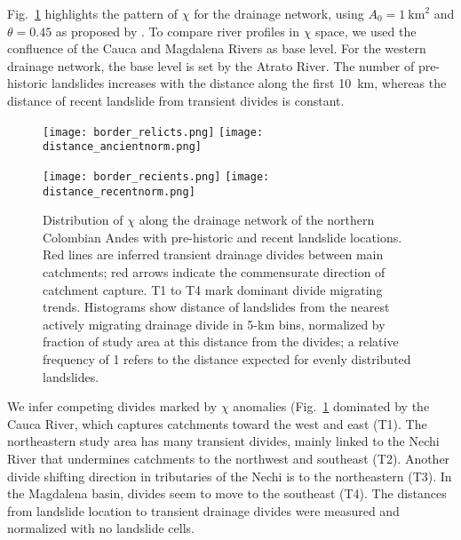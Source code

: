 \documentclass[draft]{agujournal2019}
\begin{document}
\par Fig.~\ref{fig:rel-rec} highlights the pattern of $\chi$ for the drainage network, using $A_0=1~\mathrm{km}^2$ and $\theta=0.45$ as proposed by . To compare river profiles in $\chi$ space, we used the confluence of the Cauca and Magdalena Rivers as base level. For the western drainage network, the base level is set by the Atrato River. The number of pre-historic landslides increases with the distance along the first 10~km, whereas the distance of recent landslide from transient divides is constant.

\begin{figure}[ht!]
  \begin{minipage}{.48\linewidth}
    \centering
      {\texttt{[image: border\_relicts.png]}}
      {\texttt{[image: distance\_ancientnorm.png]}}
  \end{minipage}\quad
  \begin{minipage}{.48\linewidth}
    \centering
      {\texttt{[image: border\_recients.png]}}
      {\texttt{[image: distance\_recentnorm.png]}}
  \end{minipage}
    \caption{Distribution of $\chi$ along the drainage network of the northern Colombian Andes with pre-historic and recent landslide locations. Red lines are inferred transient drainage divides between main catchments; red arrows indicate the commensurate direction of catchment capture. T1 to T4 mark dominant divide migrating trends. Histograms show distance of landslides from the nearest actively migrating drainage divide in 5-km bins, normalized by fraction of study area at this distance from the divides; a relative frequency of 1 refers to the distance expected for evenly distributed landslides.}
    \label{fig:rel-rec}
\end{figure}

\par We infer competing divides marked by $\chi$ anomalies (Fig.~\ref{fig:rel-rec} dominated by the Cauca River, which captures catchments toward the west and east (T1). The northeastern study area has many transient divides, mainly linked to the Nechi River that undermines catchments to the northwest and southeast (T2). Another divide shifting direction in tributaries of the Nechi is to the northeastern (T3). In the Magdalena basin, divides seem to move to the southeast (T4). The distances from landslide location to transient drainage divides were measured and normalized with no landslide cells.
\end{document}
